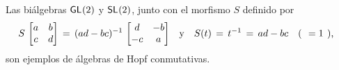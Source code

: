 
\begin{propoLinealGeneral}\label{propo:hopflinealgeneral}
	Las bi\'{a}lgebras $\mathsf{GL}_{}(2)$ y $\mathsf{SL}_{}(2)$, junto con el morfismo $S$
	definido por
	\begin{align*}
		S\,\begin{bmatrix} a & b \\ c & d \end{bmatrix} \,=\,
			(ad-bc)^{-1}\,
				\begin{bmatrix} d & -b \\ -c & a \end{bmatrix}
			& \quad\text{y}\quad
		S(t) \,=\,t^{-1}\,=\,ad-bc
			\quad\text{(\phantom)}=1\text{\phantom(),}
	\end{align*}
	son ejemplos de \'{a}lgebras de Hopf conmutativas.
\end{propoLinealGeneral}

